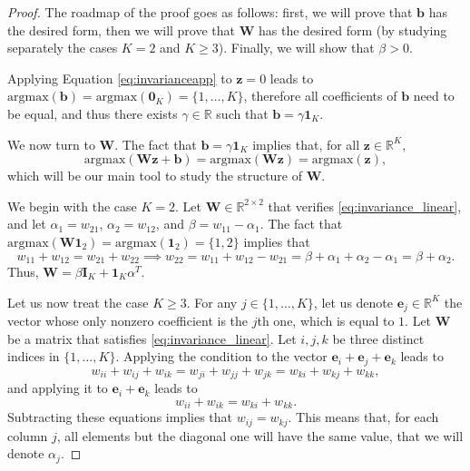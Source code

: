 \documentclass[10pt,dvipsnames]{article}
\newcommand{\bz}{\mathbf{z}}%
\newcommand{\bW}{\mathbf{W}}%
\newcommand{\bb}{\mathbf{b}}%
\newcommand{\bI}{\mathbf{I}}%
\newcommand{\bun}{\mathbf{1}}%
\newcommand{\be}{\mathbf{e}}%
\theoremstyle{plain}
\theoremstyle{definition}
\theoremstyle{remark}
\begin{document}
\begin{proof}
The roadmap of the proof goes as follows: first, we will prove that $\bb$ has the desired form, then we will prove that $\bW$ has the desired form (by studying separately the cases $K=2$ and $K \geq 3$). Finally, we will show that $\beta>0$.



Applying Equation \eqref{eq:invarianceapp} to $\bz=0$ leads to $\text{argmax}(\bb)= \text{argmax}(\boldsymbol{0}_K)= \{1, \ldots, K \} $, therefore all coefficients of $\bb$ need to be equal, and thus there exists $\gamma \in \mathbb{R}$ such that $\bb = \gamma \bun_K$.

We now turn to $\bW$. The fact that $\bb = \gamma \bun_K$ implies that, for all $\bz \in \mathbb{R}^K$, 
\begin{equation}
\label{eq:invariance_linear}
    \text{argmax}(\bW \bz+\bb)= \text{argmax}(\bW \bz) = \text{argmax}(\bz),
\end{equation}
which will be our main tool to study the structure of $\bW$.

We begin with the case $K=2$. Let $\bW \in \mathbb{R}^{2 \times 2}$ that verifies \eqref{eq:invariance_linear}, and let $\alpha_1 = w_{21}$, $\alpha_2 = w_{12}$, and $\beta = w_{11}- \alpha_1$. The fact that $\text{argmax}(\bW \bun_2) = \text{argmax}(\bun_2)= \{1,2\}$ implies that
\begin{equation}
    w_{11} + w_{12} = w_{21} +w_{22} \implies w_{22} = w_{11} + w_{12} - w_{21} = \beta + \alpha_1 + \alpha_2 - \alpha_1 = \beta + \alpha_2.
\end{equation}
Thus, $\bW = \beta \bI_K + \bun_K \alpha ^T$. 




Let us now treat the case $K\geq 3$. For any $j \in \{1,\ldots,K\}$, let us denote $\be_j\in \mathbb{R}^K$ the vector whose only nonzero coefficient is the $j$th one, which is equal to $1$. Let $\bW$ be a matrix that satisfies \eqref{eq:invariance_linear}. Let $i,j,k$ be three distinct indices in $\{1, \ldots, K\}$. Applying the condition to the vector $\be_i + \be_j + \be_k$ leads to
\begin{equation}
    w_{ii} + w_{ij} + w_{ik} = w_{ji} + w_{jj} + w_{jk} = w_{ki} + w_{kj} + w_{kk},
\end{equation}
and applying it to  $\be_i + \be_k$ leads to
\begin{equation}
    w_{ii} + w_{ik} = w_{ki} + w_{kk}.
\end{equation}
Subtracting these equations implies that $w_{ij} = w_{kj}$. This means that, for each column $j$, all elements but the diagonal one will have the same value, that we will denote $\alpha_j$. 


\end{proof}
\end{document}
